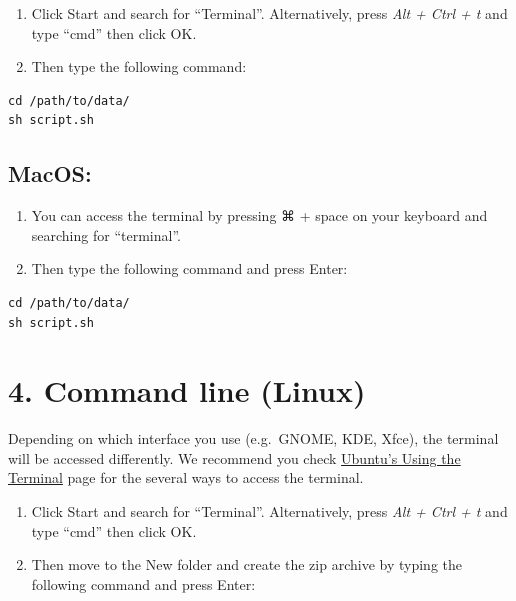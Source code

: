\documentclass[
  a4paper,
  oneside,
  open=any]{scrreport}
\providecommand{\tightlist}{%
  \setlength{\itemsep}{0pt}\setlength{\parskip}{0pt}}\usepackage{longtable,booktabs,array}
\begin{document}
\begin{enumerate}
\def\labelenumi{\arabic{enumi}.}
\tightlist
\item
  Click Start and search for ``Terminal''. Alternatively, press
  \emph{Alt + Ctrl + t} and type ``cmd'' then click OK.
\item
  Then type the following command:
\end{enumerate}

\begin{verbatim}
cd /path/to/data/
sh script.sh
\end{verbatim}

\hypertarget{macos}{%
\subsection{MacOS:}\label{macos}}

\begin{enumerate}
\def\labelenumi{\arabic{enumi}.}
\tightlist
\item
  You can access the terminal by pressing ⌘ + space on your keyboard and
  searching for ``terminal''.
\item
  Then type the following command and press Enter:
\end{enumerate}

\begin{verbatim}
cd /path/to/data/
sh script.sh
\end{verbatim}

\hypertarget{command-line-linux}{%
\section{4. Command line (Linux)}\label{command-line-linux}}

Depending on which interface you use (e.g.~GNOME, KDE, Xfce), the
terminal will be accessed differently. We recommend you check
\href{https://help.ubuntu.com/community/UsingTheTerminal?action=show\&redirect=BasicCommands}{Ubuntu's
Using the Terminal} page for the several ways to access the terminal.

\begin{enumerate}
\def\labelenumi{\arabic{enumi}.}
\tightlist
\item
  Click Start and search for ``Terminal''. Alternatively, press
  \emph{Alt + Ctrl + t} and type ``cmd'' then click OK.
\item
  Then move to the New folder and create the zip archive by typing the
  following command and press Enter:
\end{enumerate}
\end{document}
